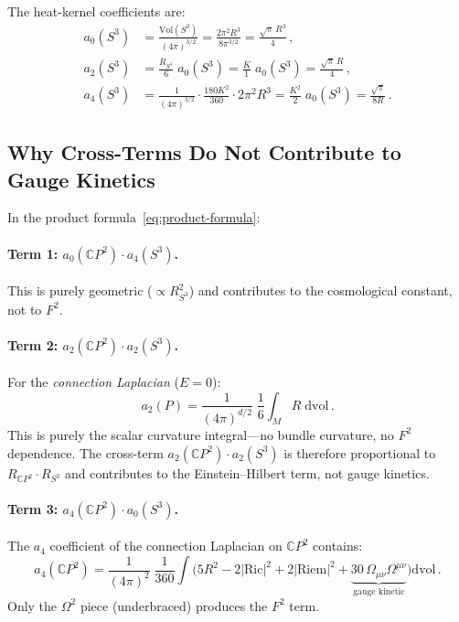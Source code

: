\documentclass[12pt,a4paper]{article}
\theoremstyle{definition}
\theoremstyle{remark}
\begin{document}
The heat-kernel coefficients are:
\begin{align}
a_0(S^3) &= \frac{\mathrm{Vol}(S^3)}{(4\pi)^{3/2}}
= \frac{2\pi^2 R^3}{8\pi^{3/2}}
= \frac{\sqrt{\pi}\,R^3}{4}\,, \\[4pt]
a_2(S^3) &= \frac{R_{S^3}}{6}\;a_0(S^3)
= \frac{K}{1}\;a_0(S^3)
= \frac{\sqrt{\pi}\,R}{4}\,, \\[4pt]
a_4(S^3) &= \frac{1}{(4\pi)^{3/2}} \cdot \frac{180K^2}{360}
\cdot 2\pi^2 R^3
= \frac{K^2}{2}\;a_0(S^3)
= \frac{\sqrt{\pi}}{8R}\,.
\end{align}

\subsection{Why Cross-Terms Do Not Contribute to Gauge Kinetics}

In the product formula~\eqref{eq:product-formula}:

\paragraph{Term 1: $a_0(\mathbb{C}P^2) \cdot a_4(S^3)$.}
This is purely geometric ($\propto R_{S^3}^2$) and contributes to the
cosmological constant, not to $F^2$.

\paragraph{Term 2: $a_2(\mathbb{C}P^2) \cdot a_2(S^3)$.}
For the \emph{connection Laplacian} ($E = 0$):
\begin{equation}
a_2(P) = \frac{1}{(4\pi)^{d/2}}\;\frac{1}{6}\int_M R\;\mathrm{dvol}\,.
\end{equation}
This is purely the scalar curvature integral---no bundle curvature,
no $F^2$ dependence.  The cross-term $a_2(\mathbb{C}P^2) \cdot a_2(S^3)$
is therefore proportional to $R_{\mathbb{C}P^2} \cdot R_{S^3}$ and
contributes to the Einstein--Hilbert term, not gauge kinetics.

\paragraph{Term 3: $a_4(\mathbb{C}P^2) \cdot a_0(S^3)$.}
The $a_4$ coefficient of the connection Laplacian on $\mathbb{C}P^2$
contains:
\begin{equation}
a_4(\mathbb{C}P^2) = \frac{1}{(4\pi)^2}\;\frac{1}{360}
\int \Big(5R^2 - 2|{\mathrm{Ric}}|^2 + 2|{\mathrm{Riem}}|^2
+ \underbrace{30\,\Omega_{\mu\nu}\Omega^{\mu\nu}}_{\text{gauge kinetic}}\Big)
\mathrm{dvol}\,.
\end{equation}
Only the $\Omega^2$ piece (underbraced) produces the $F^2$ term.
\end{document}
